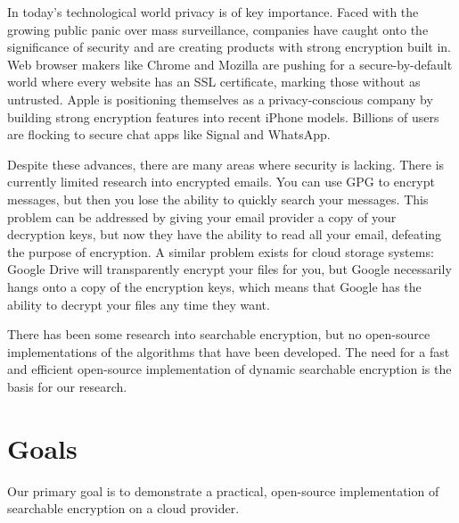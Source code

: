 
In today's technological world privacy is of key importance.
Faced with the growing public panic over mass surveillance,
companies have caught onto the significance of security and are creating products with strong encryption built in.
Web browser makers like Chrome and Mozilla are pushing for a secure-by-default world where every website has an SSL certificate, marking those without as untrusted.
Apple is positioning themselves as a privacy-conscious company by building strong encryption features into recent iPhone models.
Billions of users are flocking to secure chat apps like Signal and WhatsApp.

Despite these advances, there are many areas where security is lacking.
There is currently limited research into encrypted emails.
You can use GPG to encrypt messages, but then you lose the ability to quickly search your messages.
This problem can be addressed by giving your email provider a copy of your decryption keys, but now they have the ability to read all your email, defeating the purpose of encryption.
A similar problem exists for cloud storage systems: Google Drive will transparently encrypt your files for you, but Google necessarily hangs onto a copy of the encryption keys, which means that Google has the ability to decrypt your files any time they want.


There has been some research into searchable encryption, but no open-source implementations of the algorithms that have been developed.
The need for a fast and efficient open-source implementation of dynamic searchable encryption is the basis for our research.



\section{Goals}


Our primary goal is to demonstrate a practical, open-source implementation of searchable encryption on a cloud provider.


